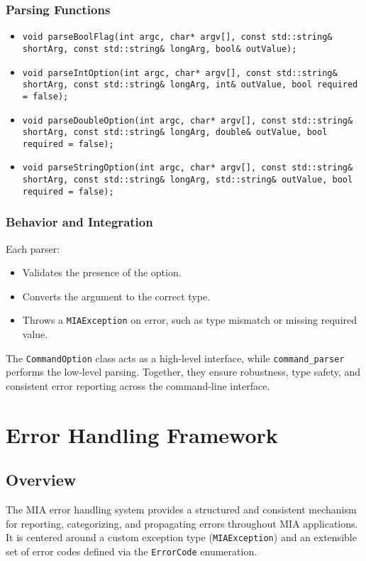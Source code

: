 \subsubsection*{Parsing Functions}
\begin{itemize}
	\item \texttt{void parseBoolFlag(int argc, char* argv[], const std::string\& shortArg, const std::string\& longArg, bool\& outValue);}
	\item \texttt{void parseIntOption(int argc, char* argv[], const std::string\& shortArg, const std::string\& longArg, int\& outValue, bool required = false);}
	\item \texttt{void parseDoubleOption(int argc, char* argv[], const std::string\& shortArg, const std::string\& longArg, double\& outValue, bool required = false);}
	\item \texttt{void parseStringOption(int argc, char* argv[], const std::string\& shortArg, const std::string\& longArg, std::string\& outValue, bool required = false);}
\end{itemize}

\subsubsection*{Behavior and Integration}
Each parser:
\begin{itemize}
	\item Validates the presence of the option.
	\item Converts the argument to the correct type.
	\item Throws a \texttt{MIAException} on error, such as type mismatch or missing required value.
\end{itemize}
The \texttt{CommandOption} class acts as a high-level interface, while \texttt{command\_parser} performs the low-level parsing. Together, they ensure robustness, type safety, and consistent error reporting across the command-line interface.














\section{Error Handling Framework}
\label{sec:error-handling}

\subsection*{Overview}
The MIA error handling system provides a structured and consistent mechanism for reporting, categorizing, and propagating errors throughout MIA applications. It is centered around a custom exception type (\texttt{MIAException}) and an extensible set of error codes defined via the \texttt{ErrorCode} enumeration.

